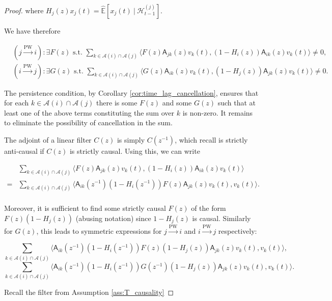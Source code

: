 \documentclass{statsoc}
\def\pwgc{\overset{\text{PW}}{\rightarrow}}  %
\def\A{\mathsf{A}}  %
\def\H{\mathcal{H}}  %
\newcommand{\linE}[2]{\hat{\E}[#1\ |\ #2]}  %
\newcommand{\anc}[1]{\mathcal{A}(#1)}  %
\def\H{\mathcal{H}}  %
\def\E{\mathbb{E}}  %
\newcommand{\inner}[2]{\langle #1, #2 \rangle}  %
\begin{document}
\begin{proof}
  where $H_j(z)x_j(t) = \linE{x_j(t)}{\H_{t - 1}^{(j)}}.$

  We have therefore

  \begin{align}
      &(j \pwgc i): \exists F(z) \text{ s.t. } \sum_{k \in \anc{i} \cap \anc{j}}\inner{F(z)\A_{jk}(z)v_k(t)}{(1 - H_i(z))\A_{ik}(z)v_k(t)} \ne 0,\\
      &(i \pwgc j): \exists G(z) \text{ s.t. } \sum_{k \in \anc{i} \cap \anc{j}}\inner{G(z)\A_{ik}(z)v_k(t)}{(1 - H_j(z))\A_{jk}(z)v_k(t)} \ne 0.
  \end{align}

  The persistence condition, by Corollary
  \ref{cor:time_lag_cancellation}, ensures that for each
  $k \in \anc{i}\cap\anc{j}$ there is some $F(z)$ and some $G(z)$ such
  that at least one of the above terms constituting the sum over $k$
  is non-zero.  It remains to eliminate the possibility of
  cancellation in the sum.

  The adjoint of a linear filter $C(z)$ is simply $C(z^{-1})$, which
  recall is strictly anti-causal if $C(z)$ is strictly causal.  Using
  this, we can write

  \begin{align*}
    &\sum_{k \in \anc{i} \cap \anc{j}}\inner{F(z)\A_{jk}(z)v_k(t)}{(1 - H_i(z))\A_{ik}(z)v_k(t)}\\
    = &\sum_{k \in \anc{i} \cap \anc{j}}\inner{\A_{ik}(z^{-1})(1 - H_i(z^{-1}))F(z)\A_{jk}(z)v_k(t)}{v_k(t)}.\\
  \end{align*}

  Moreover, it is sufficient to find some strictly causal $F(z)$ of
  the form $F(z)(1 - H_j(z))$ (abusing notation) since $1 - H_j(z)$ is
  causal.  Similarly for $G(z)$, this leads to symmetric expressions
  for $j \pwgc i$ and $i \pwgc j$ respectively:

  \begin{equation}
    \label{eqn:T_F}
    \sum_{k \in \anc{i} \cap \anc{j}}\inner{\A_{ik}(z^{-1})(1 - H_i(z^{-1}))F(z)(1 - H_j(z))\A_{jk}(z)v_k(t)}{v_k(t)},
  \end{equation}
  \begin{equation}
    \label{eqn:T_G}
    \sum_{k \in \anc{i} \cap \anc{j}}\inner{\A_{ik}(z^{-1})(1 - H_i(z^{-1}))G(z^{-1})(1 - H_j(z))\A_{jk}(z)v_k(t)}{v_k(t)}.
  \end{equation}

  Recall the filter from Assumption \ref{ass:T_causality}


\end{proof}
\end{document}
